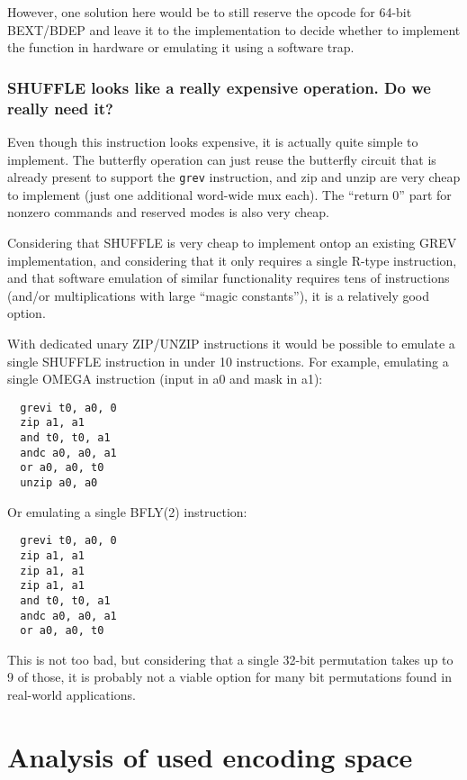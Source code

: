 However, one solution here would be to still reserve the opcode for 64-bit
BEXT/BDEP and leave it to the implementation to decide whether to implement the
function in hardware or emulating it using a software trap.

\subsubsection{SHUFFLE looks like a really expensive operation. Do we really need it?}

Even though this instruction looks expensive, it is actually quite simple to
implement.  The butterfly operation can just reuse the butterfly circuit that
is already present to support the {\tt grev} instruction, and zip and unzip are
very cheap to implement (just one additional word-wide mux each). The ``return
0'' part for nonzero commands and reserved modes is also very cheap.

Considering that SHUFFLE is very cheap to implement ontop an existing GREV
implementation, and considering that it only requires a single R-type
instruction, and that software emulation of similar functionality requires tens
of instructions (and/or multiplications with large ``magic constants''), it is a
relatively good option.

With dedicated unary ZIP/UNZIP instructions it would be possible to emulate
a single SHUFFLE instruction in under 10 instructions. For example,
emulating a single OMEGA instruction (input in a0 and mask in a1):

\begin{verbatim}
  grevi t0, a0, 0
  zip a1, a1
  and t0, t0, a1
  andc a0, a0, a1
  or a0, a0, t0
  unzip a0, a0
\end{verbatim}

Or emulating a single BFLY(2) instruction:

\begin{verbatim}
  grevi t0, a0, 0
  zip a1, a1
  zip a1, a1
  zip a1, a1
  and t0, t0, a1
  andc a0, a0, a1
  or a0, a0, t0
\end{verbatim}

This is not too bad, but considering that a single 32-bit permutation takes up to
9 of those, it is probably not a viable option for many bit permutations found
in real-world applications.

\section{Analysis of used encoding space}


